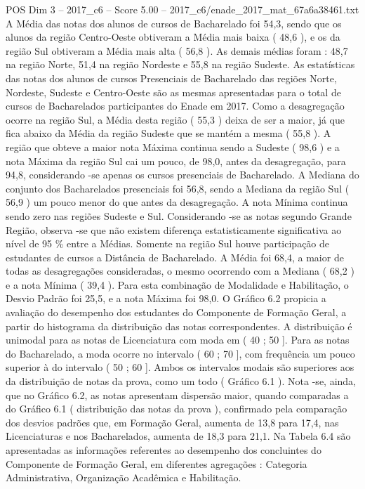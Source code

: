 \begin{textsample}{POS Dim 3 – 2017\_c6 – Score 5.00 – 2017\_c6/enade\_2017\_mat\_67a6a38461.txt}
A Média das notas dos alunos de cursos de Bacharelado foi 54,3, sendo que os alunos da região Centro-Oeste obtiveram a Média mais baixa ( 48,6 ), e os da região Sul obtiveram a Média mais alta ( 56,8 ).
As demais médias foram : 48,7 na região Norte, 51,4 na região Nordeste e 55,8 na região Sudeste.
As estatísticas das notas dos alunos de cursos Presenciais de Bacharelado das regiões Norte, Nordeste, Sudeste e Centro-Oeste são as mesmas apresentadas para o total de cursos de Bacharelados participantes do Enade em 2017.
Como a desagregação ocorre na região Sul, a Média desta região ( 55,3 ) deixa de ser a maior, já que fica abaixo da Média da região Sudeste que se mantém a mesma ( 55,8 ).
A região que obteve a maior nota Máxima continua sendo a Sudeste ( 98,6 ) e a nota Máxima da região Sul cai um pouco, de 98,0, antes da desagregação, para 94,8, considerando -se apenas os cursos presenciais de Bacharelado.
A Mediana do conjunto dos Bacharelados presenciais foi 56,8, sendo a Mediana da região Sul ( 56,9 ) um pouco menor do que antes da desagregação.
A nota Mínima continua sendo zero nas regiões Sudeste e Sul.
Considerando -se as notas segundo Grande Região, observa -se que não existem diferença estatisticamente significativa ao nível de 95 \% entre a Médias.
Somente na região Sul houve participação de estudantes de cursos a Distância de Bacharelado.
A Média foi 68,4, a maior de todas as desagregações consideradas, o mesmo ocorrendo com a Mediana ( 68,2 ) e a nota Mínima ( 39,4 ).
Para esta combinação de Modalidade e Habilitação, o Desvio Padrão foi 25,5, e a nota Máxima foi 98,0.
O Gráfico 6.2 propicia a avaliação do desempenho dos estudantes do Componente de Formação Geral, a partir do histograma da distribuição das notas correspondentes.
A distribuição é unimodal para as notas de Licenciatura com moda em ( 40 ; 50 ].
Para as notas do Bacharelado, a moda ocorre no intervalo ( 60 ; 70 ], com frequência um pouco superior à do intervalo ( 50 ; 60 ].
Ambos os intervalos modais são superiores aos da distribuição de notas da prova, como um todo ( Gráfico 6.1 ).
Nota -se, ainda, que no Gráfico 6.2, as notas apresentam dispersão maior, quando comparadas a do Gráfico 6.1 ( distribuição das notas da prova ), confirmado pela comparação dos desvios padrões que, em Formação Geral, aumenta de 13,8 para 17,4, nas Licenciaturas e nos Bacharelados, aumenta de 18,3 para 21,1.
Na Tabela 6.4 são apresentadas as informações referentes ao desempenho dos concluintes do Componente de Formação Geral, em diferentes agregações : Categoria Administrativa, Organização Acadêmica e Habilitação.

\end{textsample}
